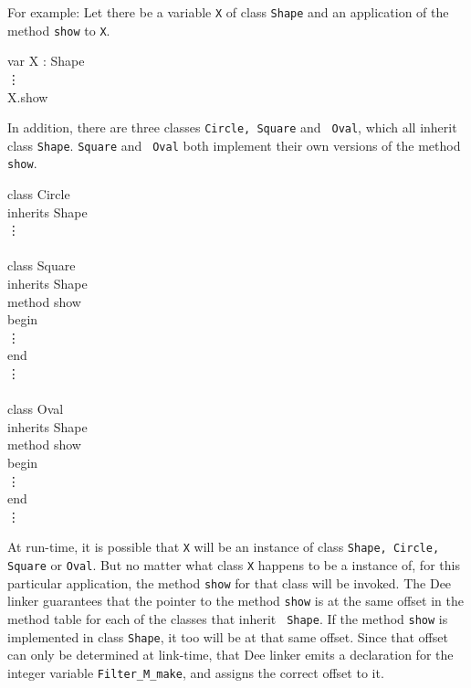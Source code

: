 For example: Let there be a variable {\tt X} of class {\tt Shape} and
an application of the method {\tt show} to {\tt X}.
\begin{prog}
\>	var X : Shape   \\
\>	\vdots          \\
\>	X.show          \\
\end{prog}
In addition, there are three classes {\tt Circle, Square} and {\tt
Oval}, which all inherit class {\tt Shape}.  {\tt Square} and {\tt
Oval} both implement their own versions of the method {\tt show}.
\begin{prog}
\>	class Circle    \\
\>	inherits Shape  \\
\>	\vdots          \\
\>                      \\
\>	class Square    \\
\>	inherits Shape  \\
\>	method show     \\
\>\>	begin           \\
\>\>	  \vdots        \\
\>\>	end             \\
\>	\vdots          \\
\>	                \\
\>	class Oval      \\
\>	inherits Shape  \\
\>	method show     \\
\>\>	begin           \\
\>\>	\vdots          \\
\>\>	end             \\
\>	\vdots
\end{prog}
At run-time, it is possible that {\tt X} will be an instance of class
{\tt Shape, Circle, Square} or {\tt Oval}.  But no matter what class
{\tt X} happens to be a instance of, for this particular application,
the method {\tt show} for that class will be invoked.  The Dee linker
guarantees that the pointer to the method {\tt show} is at the same
offset in the method table for each of the classes that inherit {\tt
Shape}.  If the method {\tt show} is implemented in class {\tt Shape},
it too will be at that same offset.  Since that offset can only be
determined at link-time, that Dee linker emits a declaration for the
integer variable {\tt Filter\_M\_make}, and assigns the correct offset
to it.


